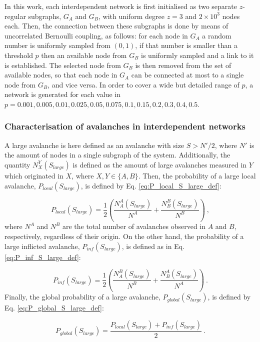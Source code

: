 In this work, each interdependent network is first initialised as two separate $z$-regular subgraphs, $G_A$ and $G_B$, with uniform degree $z=3$ and $2\times10^3$ nodes each. Then, the connection between these subgraphs is done by means of uncorrelated Bernoulli coupling, as follows: for each node in $G_A$ a random number is uniformly sampled from $(0,1)$, if that number is smaller than a threshold $p$ then an available node from $G_B$ is uniformly sampled and a link to it is established. The selected node from $G_B$ is then removed from the set of available nodes, so that each node in $G_A$ can be connected at most to a single node from $G_B$, and vice versa. In order to cover a wide but detailed range of $p$, a network is generated for each value in $p=0.001, 0.005, 0.01, 0.025, 0.05, 0.075, 0.1, 0.15, 0.2, 0.3, 0.4, 0.5$.


\subsubsection*{Characterisation of avalanches in interdependent networks}

A large avalanche is here defined as an avalanche with size $S > N' / 2$, where $N'$ is the amount of nodes in a single subgraph of the system. Additionally, the quantity $N_{X}^Y(S_{large})$ is defined as the amount of large avalanches measured in $Y$ which originated in $X$, where $X,Y\in\{A, B\}$. Then, the probability of a large local avalanche, $P_{local}(S_{large})$, is defined by Eq. \ref{eq:P_local_S_large_def}:

\begin{equation}
	P_{local}(S_{large}) = \frac{1}{2}\left(\frac{N_A^A(S_{large})}{N^A} +\frac{N_B^B(S_{large})}{N^B}\right) \ ,
	\label{eq:P_local_S_large_def}
\end{equation}
where $N^A$ and $N^B$ are the total number of avalanches observed in $A$ and $B$, respectively, regardless of their origin. On the other hand, the probability of a large inflicted avalanche, $P_{inf}(S_{large})$, is defined as in Eq. \ref{eq:P_inf_S_large_def}:

\begin{equation}
	P_{inf}(S_{large}) = \frac{1}{2}\left(\frac{N_A^B(S_{large})}{N^B} +\frac{N_B^A(S_{large})}{N^A}\right) \ .
	\label{eq:P_inf_S_large_def}
\end{equation}
Finally, the global probability of a large avalanche, $P_{global}(S_{large})$, is defined by Eq. \ref{eq:P_global_S_large_def}:

\begin{equation}
	P_{global}(S_{large}) = \frac{P_{local}(S_{large}) + P_{inf}(S_{large}) }{2} \ .
	\label{eq:P_global_S_large_def}
\end{equation}

